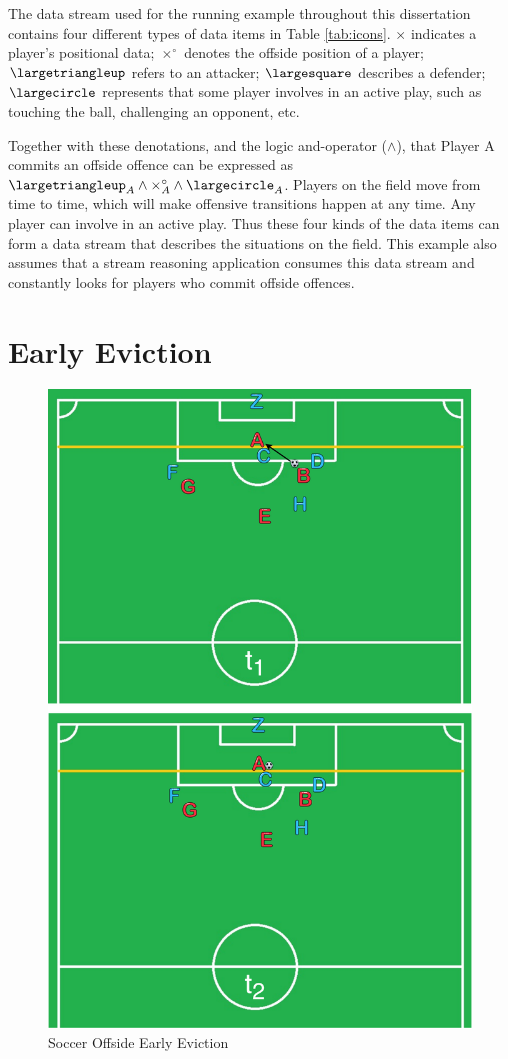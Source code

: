 The data stream used for the running example throughout this dissertation contains four different types of data items in Table \ref{tab:icons}.
$\times$ indicates a player's positional data;
$\times^{\circ}$ denotes the offside position of a player; 
$\largetriangleup$ refers to an attacker;
$\largesquare$ describes a defender;
$\largecircle$ represents that some player involves in an active play, such as touching the ball, challenging an opponent, etc.

Together with these denotations, and the logic and-operator ($\wedge$), that Player A commits an offside offence can be expressed as
$\largetriangleup_{A} \wedge \times^{\circ}_{A} \wedge \largecircle_{A}$. 
Players on the field move from time to time, which will make offensive transitions happen at any time.
Any player can involve in an active play. 
Thus these four kinds of the data items can form a data stream that describes the situations on the field.
This example also assumes that a stream reasoning application consumes this data stream and constantly looks for players who commit offside offences. 
%
\section{Early Eviction}

\begin{figure}[!htbp]
	\centering
	\includegraphics[width=5in]{img/1-seeh.pdf}
	\caption{Soccer Offside Early Eviction}
	\label{fig:1-seeh} 
\end{figure}

